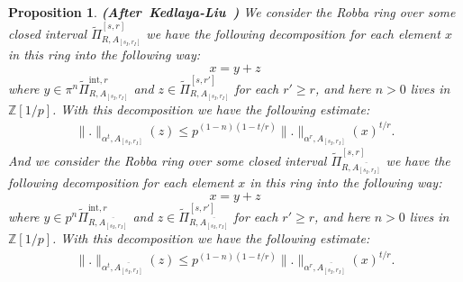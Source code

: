 \documentclass[12pt]{amsart}
\newtheorem{proposition}[theorem]{Proposition}
\theoremstyle{definition}
\numberwithin{equation}{section}
\begin{document}
\begin{proposition} \mbox{\bf{(After Kedlaya-Liu \cite[Lemma 5.2.7]{KL1})}} 
We consider the Robba ring over some closed interval $\widetilde{\Pi}^{[s,r]}_{R,A_{[s_I,r_I]}}$ we have the following decomposition for each element $x$ in this ring into the following way:
\begin{displaymath}
x=y+z	
\end{displaymath}
where $y\in \pi^n \widetilde{\Pi}^{\mathrm{int},r}_{R,A_{[s_I,r_I]}}$ and $z\in \widetilde{\Pi}^{[s,r']}_{R,A_{[s_I,r_I]}}$ for each $r'\geq r$, and here $n>0$ lives in $\mathbb{Z}[1/p]$. With this decomposition we have the following estimate:
\begin{align}
\|.\|_{\alpha^t,A_{[s_I,r_I]}}(z)\leq p^{(1-n)(1-t/r)}\|.\|_{\alpha^r,A_{[s_I,r_I]}}(x)^{t/r}.	
\end{align}
And we consider the Robba ring over some closed interval $\widetilde{\Pi}^{[s,r]}_{R,\overline{A_{[s_I,r_I]}}}$ we have the following decomposition for each element $x$ in this ring into the following way:
\begin{displaymath}
x=y+z	
\end{displaymath}
where $y\in p^n \widetilde{\Pi}^{\mathrm{int},r}_{R,\overline{A_{[s_I,r_I]}}}$ and $z\in \widetilde{\Pi}^{[s,r']}_{R,\overline{A_{[s_I,r_I]}}}$ for each $r'\geq r$, and here $n>0$ lives in $\mathbb{Z}[1/p]$. With this decomposition we have the following estimate:
\begin{align}
\|.\|_{\alpha^t,\overline{A_{[s_I,r_I]}}}(z)\leq p^{(1-n)(1-t/r)}\|.\|_{\alpha^r,\overline{A_{[s_I,r_I]}}}(x)^{t/r}.	
\end{align}
	
\end{proposition}
\end{document}
